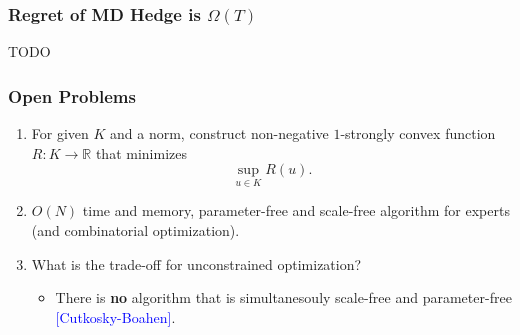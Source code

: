 \documentclass[usenames,dvipsnames]{beamer}
\newcommand{\R}{\mathbb{R}}
\newcommand{\Cite}[1]{{\tiny \textcolor{Blue}{[#1]}}}
\begin{document}
\begin{frame}
\frametitle{Regret of MD Hedge is $\Omega(T)$}

TODO

\end{frame}

\begin{frame}
\frametitle{Open Problems}

\begin{enumerate}
\item For given $K$ and a norm, construct non-negative $1$-strongly convex
function $R:K \to \R$ that minimizes
$$
\sup_{u \in K} R(u).
$$

\item $O(N)$ time and memory, parameter-free and scale-free algorithm
for experts (and combinatorial optimization).

\item What is the trade-off for unconstrained optimization?

\begin{itemize}
\item There is \textbf{no} algorithm that is simultanesouly scale-free
and parameter-free \Cite{Cutkosky-Boahen}.
\end{itemize}

\end{enumerate}

\end{frame}
\end{document}
